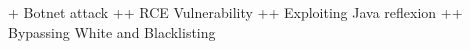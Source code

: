 + Botnet attack
++ RCE Vulnerability
++ Exploiting Java reflexion
++ Bypassing White and Blacklisting

